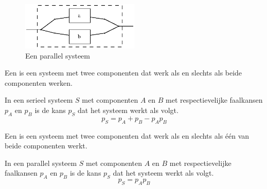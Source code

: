 \documentclass[main.tex]{subfiles}
\begin{document}
\begin{figure}[H]
  \caption{Een parallel systeem}
  \centering
    \includegraphics[width=0.5\textwidth]{assets/systeem-parallel.eps}
\end{figure}

\begin{de}
  Een  is een systeem met twee componenten dat werk als en slechts als beide componenten werken.
\end{de}

\begin{st}
  In een serieel systeem $S$ met componenten $A$ en $B$ met respectievelijke faalkansen $p_{A}$ en $p_{B}$ is de kans $p_{S}$ dat het systeem werkt als volgt.
  \[ p_{S} = p_{A} + p_{B} -p_{A}p_{B} \]
\end{st}

\begin{de}
  Een  is een systeem met twee componenten dat werk als en slechts als \'e\'en van beide componenten werkt.
\end{de}

\begin{st}
  In een parallel systeem $S$ met componenten $A$ en $B$ met respectievelijke faalkansen $p_{A}$ en $p_{B}$ is de kans $p_{S}$ dat het systeem werkt als volgt.
  \[ p_{S} = p_{A}p_{B} \]
\end{st}
\end{document}
